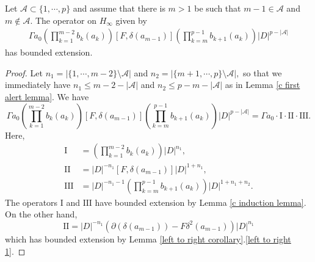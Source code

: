     \begin{lem}\label{c second alert lemma} 
        Let $\mathscr{A}\subset\{1,\cdots,p\}$ and assume that there is $m > 1$ be such that $m-1\in\mathscr{A}$ and $m\notin\mathscr{A}.$ The operator on $H_\infty$ given by
        \begin{align*}
            \Gamma a_0\left(\prod_{k=1}^{m-2}b_k(a_k)\right)[F,\delta(a_{m-1})]\left(\prod_{k=m}^{p-1}b_{k+1}(a_k)\right)|D|^{p-|\mathscr{A}|}
        \end{align*}
        has bounded extension.
    \end{lem}
    \begin{proof} 
        Let $n_1=|\{1,\cdots,m-2\}\setminus\mathscr{A}|$ and $n_2=|\{m+1,\cdots,p\}\setminus\mathscr{A}|,$ so that we immediately have $n_1 \leq m-2-|\mathscr{A}|$ and $n_2\leq p-m-|\mathscr{A}|$ as in Lemma \ref{c first alert lemma}. We have
        $$\Gamma a_0\left(\prod_{k=1}^{m-2}b_k(a_k)\right)[F,\delta(a_{m-1})]\left(\prod_{k=m}^{p-1}b_{k+1}(a_k)\right)|D|^{p-|\mathscr{A}|}=\Gamma a_0\cdot \mathrm{I}\cdot \mathrm{II}\cdot \mathrm{III}.$$
        Here,
        \begin{align*}
              \mathrm{I} &= \left(\prod_{k=1}^{m-2}b_k(a_k)\right)|D|^{n_1},\\
             \mathrm{II} &= |D|^{-n_1}[F,\delta(a_{m-1})]|D|^{1+n_1},\\
            \mathrm{III} &= |D|^{-n_1-1}\left(\prod_{k=m}^{p-1}b_{k+1}(a_k)\right)|D|^{1+n_1+n_2}.
        \end{align*}
        The operators $\mathrm{I}$ and $\mathrm{III}$ have bounded extension by Lemma \ref{c induction lemma}. On the other hand, 
        \begin{equation*}
            \mathrm{II} = |D|^{-n_1}(\partial(\delta(a_{m-1}))-F\delta^2(a_{m-1}))|D|^{n_1}
        \end{equation*}
        which has bounded extension by Lemma \ref{left to right corollary}.\eqref{left to right 1}.
    \end{proof}

